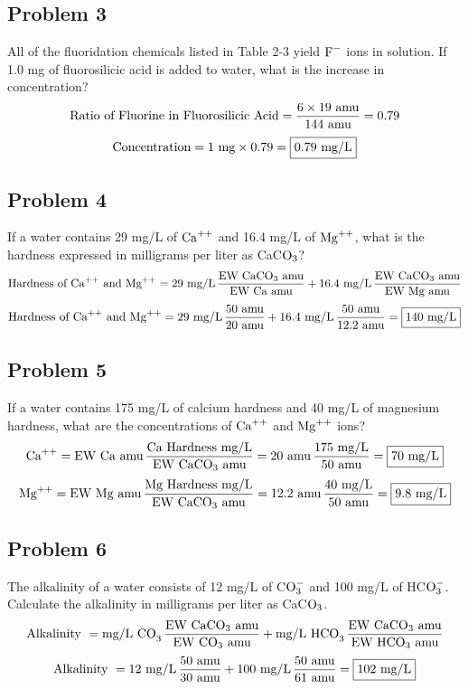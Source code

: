 \subsection*{Problem 3}
All of the fluoridation chemicals listed in Table 2-3 yield \(\textnormal{F}^-\) ions in solution. If 1.0 mg of fluorosilicic acid is added to water, what is the increase in concentration?
\[\textnormal{Ratio of Fluorine in Fluorosilicic Acid}=\frac{6\times 19\textnormal{ amu}}{144\textnormal{ amu}}=0.79\]
\[\textnormal{Concentration}=1\textnormal{ mg}\times 0.79=\boxed{0.79 \textnormal{ mg/L}}\]
\subsection*{Problem 4}
If a water contains 29 mg/L of \(\textnormal{Ca}^{++}\) and 16.4 mg/L of \(\textnormal{Mg}^{++}\), what is the hardness expressed in milligrams per liter as CaC\(\textnormal{O}_3\)?
\[\textnormal{Hardness of }\textnormal{Ca}^{++}\textnormal{ and Mg}^{++}=29\textnormal{ mg/L}\,\frac{\textnormal{EW CaCO}_3\textnormal{ amu}}{\textnormal{EW Ca amu}}+16.4\textnormal{ mg/L}\,\frac{\textnormal{EW CaCO}_3\textnormal{ amu}}{\textnormal{EW Mg amu}}\]
\[\textnormal{Hardness of }\textnormal{Ca}^{++}\textnormal{ and Mg}^{++}=29\textnormal{ mg/L}\,\frac{50\textnormal{ amu}}{20\textnormal{ amu}}+16.4\textnormal{ mg/L}\,\frac{50\textnormal{ amu}}{12.2\textnormal{ amu}}=\boxed{140\textnormal{ mg/L}}\]
\subsection*{Problem 5}
If a water contains 175 mg/L of calcium hardness and 40 mg/L of magnesium hardness, what are the concentrations of \(\textnormal{Ca}^{++}\) and \(\textnormal{Mg}^{++}\) ions?
\[\textnormal{Ca}^{++}=\textnormal{EW Ca amu}\,\frac{\textnormal{Ca Hardness mg/L}}{\textnormal{EW CaCO}_3\textnormal{ amu}}=20\textnormal{ amu}\,\frac{175\textnormal{ mg/L}}{50\textnormal{ amu}}=\boxed{70 \textnormal{ mg/L}}\]
\[\textnormal{Mg}^{++}=\textnormal{EW Mg amu}\,\frac{\textnormal{Mg Hardness mg/L}}{\textnormal{EW CaCO}_3\textnormal{ amu}}=12.2\textnormal{ amu}\,\frac{40\textnormal{ mg/L}}{50\textnormal{ amu}}=\boxed{9.8 \textnormal{ mg/L}}\]
\subsection*{Problem 6}
The alkalinity of a water consists of 12 mg/L of C\(\textnormal{O}_3^-\) and 100 mg/L of HC\(\textnormal{O}_3^-\). Calculate the alkalinity in milligrams per liter as CaC\(\textnormal{O}_3\).
\[\textnormal{Alkalinity }=\textnormal{mg/L CO}_3\,\frac{\textnormal{EW CaCO}_3\textnormal{ amu}}{\textnormal{EW CO}_3\textnormal{ amu}}+\textnormal{mg/L HCO}_3\,\frac{\textnormal{EW CaCO}_3\textnormal{ amu}}{\textnormal{EW HCO}_3\textnormal{ amu}}\]
\[\textnormal{Alkalinity }=12\textnormal{ mg/L}\,\frac{50\textnormal{ amu}}{30\textnormal{ amu}}+100\textnormal{ mg/L}\,\frac{50\textnormal{ amu}}{61\textnormal{ amu}}=\boxed{102\textnormal{ mg/L}}\]
\newpage
